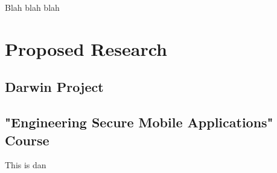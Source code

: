 



Blah blah blah

\section{Proposed Research}


\subsection{Darwin Project} %

















\subsection{"Engineering Secure Mobile Applications" Course}


This is dan





